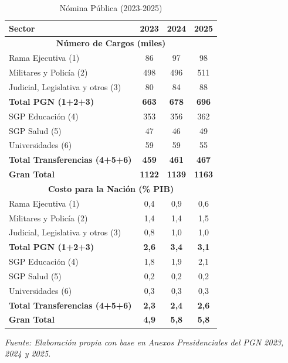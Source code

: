 \begin{table}[h!]
    \caption{Nómina Pública (2023-2025)}
    \label{tab:nomina}
    \centering
    \begin{tabular}{lccc}
        \hline
        \textbf{Sector} & \textbf{2023} & \textbf{2024} & \textbf{2025} \\
        \hline
        \multicolumn{4}{c}{\textbf{Número de Cargos (miles)}} \\
        \hline
        Rama Ejecutiva (1) & 86 & 97 & 98 \\
        Militares y Policía (2) & 498 & 496 & 511 \\
        Judicial, Legislativa y otros (3) & 80 & 84 & 88 \\
        \hline
        \textbf{Total PGN (1+2+3)} & \textbf{663} & \textbf{678} & \textbf{696} \\ \hline
        SGP Educación (4) & 353 & 356 & 362 \\ 
        SGP Salud (5) & 47 & 46 & 49 \\
        Universidades (6) & 59 & 59 & 55 \\ \hline
        \textbf{Total Transferencias (4+5+6)} & \textbf{459} & \textbf{461} & \textbf{467} \\ \hline
        \textbf{Gran Total} & \textbf{1122} & \textbf{1139} & \textbf{1163} \\
        \hline
        \multicolumn{4}{c}{\textbf{Costo para la Nación (\% PIB)}} \\
        \hline
        Rama Ejecutiva (1) & 0,4 & 0,9 & 0,6 \\
        Militares y Policía (2) & 1,4 & 1,4 & 1,5 \\
        Judicial, Legislativa y otros (3) & 0,8 & 1,0 & 1,0 \\
        \textbf{Total PGN (1+2+3)} & \textbf{2,6} & \textbf{3,4} & \textbf{3,1} \\
        \hline
        SGP Educación (4) & 1,8 & 1,9 & 2,1 \\ 
        SGP Salud (5) & 0,2 & 0,2 & 0,2 \\
        Universidades (6) & 0,3 & 0,3 & 0,3 \\
        \textbf{Total Transferencias (4+5+6)}  & \textbf{2,3} & \textbf{2,4} & \textbf{2,6} \\
        \hline
        \textbf{Gran Total} & \textbf{4,9} & \textbf{5,8} & \textbf{5,8} \\
        \hline
    \end{tabular}
\vspace{0.3cm}
\par\footnotesize{\textit{Fuente: Elaboración propia con base en Anexos Presidenciales del PGN 2023, 2024 y 2025.}}  
\end{table}
